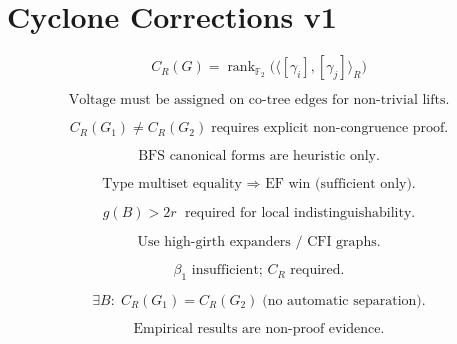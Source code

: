 \documentclass{article}
\begin{document}
\section*{Cyclone Corrections v1}

\[
C_R(G)=\operatorname{rank}_{\mathbb{F}_2}\Big(\langle [\gamma_i],[\gamma_j]\rangle_R\Big)
\]

\[
\text{Voltage must be assigned on co-tree edges for non-trivial lifts.}
\]

\[
C_R(G_1)\neq C_R(G_2)\;\text{requires explicit non-congruence proof.}
\]

\[
\text{BFS canonical forms are heuristic only.}
\]

\[
\text{Type multiset equality }\Rightarrow\text{ EF win (sufficient only).}
\]

\[
g(B)>2r\;\text{ required for local indistinguishability.}
\]

\[
\text{Use high-girth expanders / CFI graphs.}
\]

\[
\beta_1\text{ insufficient; }C_R\text{ required.}
\]

\[
\exists B:\;C_R(G_1)=C_R(G_2)\;\text{(no automatic separation).}
\]

\[
\text{Empirical results are non-proof evidence.}
\]
\end{document}

